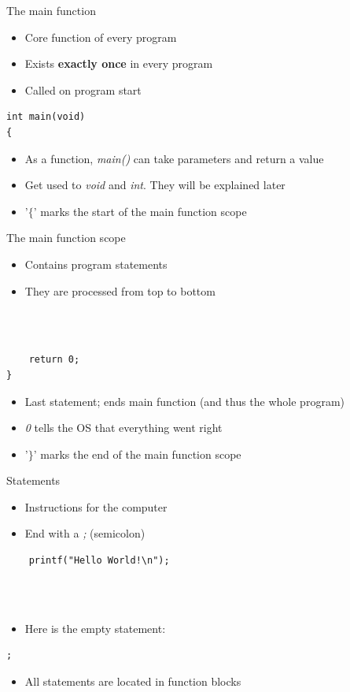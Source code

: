 \begin{frame}[fragile]{The main function}
	\begin{itemize}
		\item Core function of every program
		\item Exists \textbf{exactly once} in every program
		\item Called on program start
	\end{itemize}
	\begin{lstlisting}
int main(void)
{
\end{lstlisting}
	\begin{itemize}
		\item As a function, \textit{main()} can take parameters and return a value
		\item Get used to \textit{void} and \textit{int}. They will be explained later
		\item '$\lbrace$' marks the start of the main function scope
	\end{itemize}
\end{frame}
\begin{frame}[fragile]{The main function scope}
	\begin{itemize}
		\item Contains program statements
		\item They are processed from top to bottom
	\end{itemize} \ \\
	\ \\
	\begin{lstlisting}
	return 0;
}
\end{lstlisting}
	\begin{itemize}
		\item Last statement; ends main function (and thus the whole program)
		\item \textit{0} tells the OS that everything went right
		\item '$\rbrace$' marks the end of the main function scope
	\end{itemize}
\end{frame}
\begin{frame}[fragile]{Statements}
	\begin{itemize}
		\item Instructions for the computer
		\item End with a \textit{;} (semicolon)
	\end{itemize}
	\begin{lstlisting}
	printf("Hello World!\n");
\end{lstlisting} \ \\ \ \\
	\begin{itemize}
		\item Here is the empty statement:
	\end{itemize}
	\begin{lstlisting}[numbers=none]
	;
\end{lstlisting}
	\begin{itemize}
		\item All statements are located in function blocks
	\end{itemize}
\end{frame}
